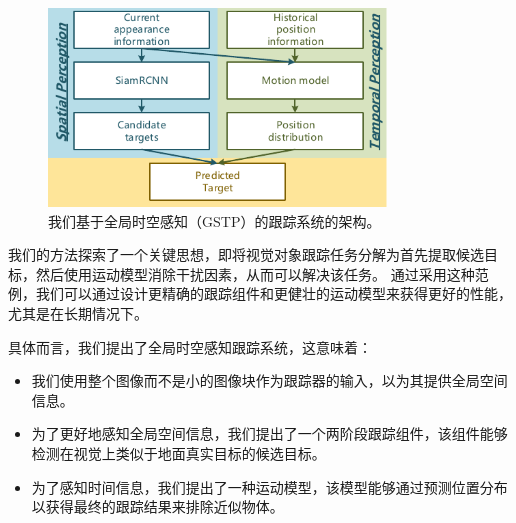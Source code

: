 \begin{figure}[t]
	\centering
    \includegraphics[width=0.8\textwidth]{Img/globally/Arch7.pdf}
    \caption{我们基于全局时空感知（GSTP）的跟踪系统的架构。}
    \label{fig:arch}
\end{figure}

我们的方法探索了一个关键思想，即将视觉对象跟踪任务分解为首先提取候选目标，然后使用运动模型消除干扰因素，从而可以解决该任务。
通过采用这种范例，我们可以通过设计更精确的跟踪组件和更健壮的运动模型来获得更好的性能，尤其是在长期情况下。

具体而言，我们提出了全局时空感知跟踪系统，这意味着：
\begin{itemize}
\item 我们使用整个图像而不是小的图像块作为跟踪器的输入，以为其提供全局空间信息。
\item 为了更好地感知全局空间信息，我们提出了一个两阶段跟踪组件，该组件能够检测在视觉上类似于地面真实目标的候选目标。
\item 为了感知时间信息，我们提出了一种运动模型，该模型能够通过预测位置分布以获得最终的跟踪结果来排除近似物体。
\end{itemize}

